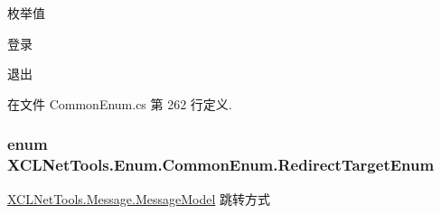 \begin{Desc}
\item[枚举值]\par
\begin{description}
\item[{\em 
\hypertarget{class_x_c_l_net_tools_1_1_enum_1_1_common_enum_a2d2cb4aef1c5cbc23f73c25b5f0c2948a90651ebea9a35ec4e018c8157492e17c}{O\-N}\label{class_x_c_l_net_tools_1_1_enum_1_1_common_enum_a2d2cb4aef1c5cbc23f73c25b5f0c2948a90651ebea9a35ec4e018c8157492e17c}
}]登录 \item[{\em 
\hypertarget{class_x_c_l_net_tools_1_1_enum_1_1_common_enum_a2d2cb4aef1c5cbc23f73c25b5f0c2948a88559a0cfd8250c9d65970cc145c92d4}{O\-F\-F}\label{class_x_c_l_net_tools_1_1_enum_1_1_common_enum_a2d2cb4aef1c5cbc23f73c25b5f0c2948a88559a0cfd8250c9d65970cc145c92d4}
}]退出 \end{description}
\end{Desc}


在文件 Common\-Enum.\-cs 第 262 行定义.

\hypertarget{class_x_c_l_net_tools_1_1_enum_1_1_common_enum_a1cd31513e5ecf78c77d76be7954ae2f4}{
\subsubsection[{Redirect\-Target\-Enum}]{\setlength{\rightskip}{0pt plus 5cm}enum {\bf X\-C\-L\-Net\-Tools.\-Enum.\-Common\-Enum.\-Redirect\-Target\-Enum}}}\label{class_x_c_l_net_tools_1_1_enum_1_1_common_enum_a1cd31513e5ecf78c77d76be7954ae2f4}


\hyperlink{class_x_c_l_net_tools_1_1_message_1_1_message_model}{X\-C\-L\-Net\-Tools.\-Message.\-Message\-Model} 跳转方式 

